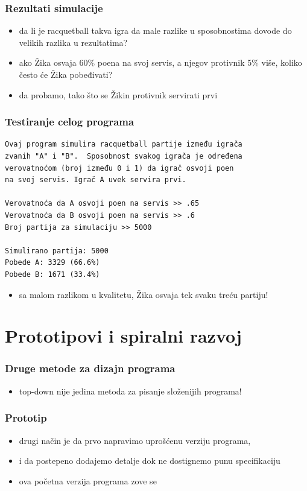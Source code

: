 \documentclass[utf8,compress,aspectratio=169]{beamer}
\begin{document}
\begin{frame}
  \frametitle{Rezultati simulacije}
\begin{itemize}
  \item da li je racquetball takva igra da male razlike u sposobnostima dovode do velikih razlika u rezultatima?
  \item ako Žika osvaja 60\% poena na svoj servis, a njegov protivnik 5\% više, koliko često će Žika pobeđivati?
  \item da probamo, tako što se Žikin protivnik servirati prvi
\end{itemize}
\end{frame}

\begin{frame}[fragile,shrink=5]
  \frametitle{Testiranje celog programa}
\begin{verbatim}
Ovaj program simulira racquetball partije između igrača
zvanih "A" i "B".  Sposobnost svakog igrača je određena
verovatnoćom (broj između 0 i 1) da igrač osvoji poen
na svoj servis. Igrač A uvek servira prvi.

Verovatnoća da A osvoji poen na servis >> .65
Verovatnoća da B osvoji poen na servis >> .6
Broj partija za simulaciju >> 5000

Simulirano partija: 5000
Pobede A: 3329 (66.6%)
Pobede B: 1671 (33.4%)
\end{verbatim}
\begin{itemize}
  \item sa malom razlikom u kvalitetu, Žika osvaja tek svaku treću partiju!
\end{itemize}
\end{frame}

\section[Prototipovi]{Prototipovi i spiralni razvoj}

\begin{frame}
  \frametitle{Druge metode za dizajn programa}
\begin{itemize}
  \item top-down nije jedina metoda za pisanje složenijih programa!
\end{itemize}
\end{frame}

\begin{frame}
  \frametitle{Prototip}
\begin{itemize}
  \item drugi način je da prvo napravimo uprošćenu verziju programa,
  \item i da postepeno dodajemo detalje dok ne dostignemo punu specifikaciju
  \item ova početna verzija programa zove se 
\end{itemize}
\end{frame}
\end{document}
